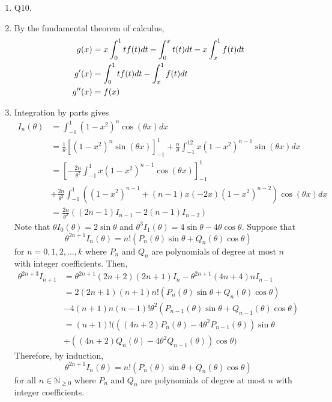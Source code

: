 \documentclass[10pt, a4paper, twoside]{report}
\begin{document}
\begin{enumerate}[{1.}]
    \item Q10.
    \item By the fundamental theorem of calculus,
    \begin{align*}
        g(x)&=x\int_0^1tf(t)dt-\int_0^xt(t)dt-x\int_x^1f(t)dt \\
        g^\prime(x)&=\int_0^1tf(t)dt-\int_x^1f(t)dt \\
        g^{\prime\prime}(x)&=f(x)
    \end{align*}
    \item Integration by parts gives 
    \begin{align*}
        I_n(\theta)&=\int_{-1}^1(1-x^2)^n\cos(\theta x)dx \\
        &=\frac 1\theta\left[(1-x^2)^n\sin(\theta x)\right]_{-1}^1+\frac n\theta\int_{-1}^12x(1-x^2)^{n-1}\sin(\theta x)dx \\
        &=\left[-\frac{2n}{\theta^2}\int_{-1}^1x(1-x^2)^{n-1}\cos(\theta x)\right]_{-1}^1 \\
        &+\frac{2n}{\theta^2}\int_{-1}^{1}\left((1-x^2)^{n-1}+(n-1)x(-2x)(1-x^2)^{n-2}\right)\cos(\theta x)dx \\
        &=\frac{2n}{\theta^2}((2n-1)I_{n-1}-2(n-1)I_{n-2})
    \end{align*}
    Note that \(\theta I_0(\theta)=2\sin\theta\) and \(\theta^3 I_1(\theta)=4\sin\theta-4\theta\cos\theta\). Suppose that 
    \[\theta^{2n+1}I_n(\theta)=n!(P_n(\theta)\sin\theta+Q_n(\theta)\cos\theta)\]
    for \(n=0,1,2,\ldots,k\) where \(P_n\) and \(Q_n\) are polynomials of degree at most \(n\) with integer coefficients. Then,
    \begin{align*}
        \theta^{2n+3}I_{n+1}&=\theta^{2n+1}(2n+2)(2n+1)I_n-\theta^{2n+1}(4n+4)nI_{n-1} \\
        &=2(2n+1)(n+1)n!(P_n(\theta)\sin\theta+Q_n(\theta)\cos\theta)\\
        &-4(n+1)n(n-1)!\theta^2(P_{n-1}(\theta)\sin\theta+Q_{n-1}(\theta)\cos\theta) \\
        &=(n+1)!(((4n+2)P_n(\theta)-4\theta^2P_{n-1}(\theta))\sin\theta\\
        &+((4n+2)Q_n(\theta)-4\theta^2Q_{n-1}(\theta))\cos\theta)
    \end{align*}
    Therefore, by induction,
    \[\theta^{2n+1}I_n(\theta)=n!(P_n(\theta)\sin\theta+Q_n(\theta)\cos\theta)\]
    for all \(n\in\mathbb{N}_{\geq 0}\) where \(P_n\) and \(Q_n\) are polynomials of degree at most \(n\) with integer coefficients.


\end{enumerate}
\end{document}
